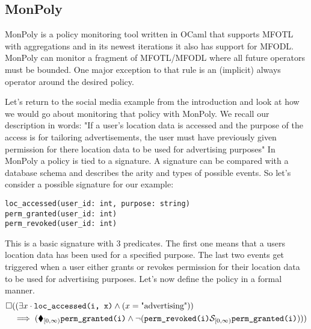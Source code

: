 \subsection{MonPoly}
MonPoly \cite{Basin2017} is a policy monitoring tool written in OCaml that supports MFOTL with aggregations and in its newest iterations it also has support for MFODL.
MonPoly can monitor a fragment of MFOTL/MFODL where all future operators must be bounded.
One major exception to that rule is an (implicit) always operator around the desired policy.

Let's return to the social media example from the introduction and look at how we would go about monitoring that policy with MonPoly.
We recall our description in words:
    "If a user's location data is accessed and the purpose of the access is for tailoring advertisements, the user must have previously given permission for there location data to be used for advertising purposes"
In MonPoly a policy is tied to a signature.
A signature can be compared with a database schema and describes the arity and types of possible events.
So let's consider a possible signature for our example: 


\begin{verbatim}
loc_accessed(user_id: int, purpose: string)
perm_granted(user_id: int)
perm_revoked(user_id: int)
\end{verbatim}

This is a basic signature with 3 predicates.
The first one means that a users location data has been used for a specified purpose.
The last two events get triggered when a user either grants or revokes permission for their location data to be used for advertising purposes.
Let's now define the policy in a formal manner.
\begin{align*}
    \square &((\exists x \cdot \texttt{loc\_accessed(i, x)} 
        \land (x = \text{"advertising"})) \\
    &\implies (\blacklozenge_{[0,\infty)} \texttt{perm\_granted(i)} 
         \land  \neg (\texttt{perm\_revoked(i)} \mathcal{S}_{[0,\infty)} 
            \texttt{perm\_granted(i)})))
\end{align*}

